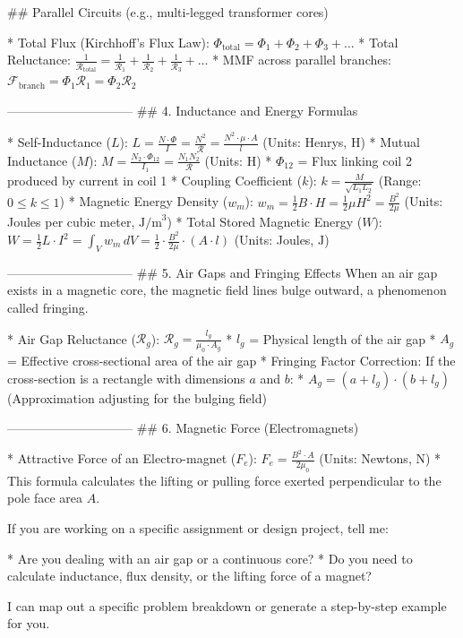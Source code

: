 ## Parallel Circuits (e.g., multi-legged transformer cores)

* Total Flux (Kirchhoff's Flux Law): $\Phi_{\text{total}} = \Phi_1 + \Phi_2 + \Phi_3 + \dots$
* Total Reluctance: $\frac{1}{\mathcal{R}_{\text{total}}} = \frac{1}{\mathcal{R}_1} + \frac{1}{\mathcal{R}_2} + \frac{1}{\mathcal{R}_3} + \dots$
* MMF across parallel branches: $\mathcal{F}_{\text{branch}} = \Phi_1 \mathcal{R}_1 = \Phi_2 \mathcal{R}_2$

------------------------------
## 4. Inductance and Energy Formulas

* Self-Inductance ($L$): $L = \frac{N \cdot \Phi}{I} = \frac{N^2}{\mathcal{R}} = \frac{N^2 \cdot \mu \cdot A}{l}$ (Units: Henrys, $\text{H}$)
* Mutual Inductance ($M$): $M = \frac{N_2 \cdot \Phi_{12}}{I_1} = \frac{N_1 N_2}{\mathcal{R}}$ (Units: $\text{H}$)
* $\Phi_{12}$ = Flux linking coil 2 produced by current in coil 1
* Coupling Coefficient ($k$): $k = \frac{M}{\sqrt{L_1 L_2}}$ (Range: $0 \le k \le 1$)
* Magnetic Energy Density ($w_m$): $w_m = \frac{1}{2} B \cdot H = \frac{1}{2} \mu H^2 = \frac{B^2}{2\mu}$ (Units: Joules per cubic meter, $\text{J/m}^3$)
* Total Stored Magnetic Energy ($W$): $W = \frac{1}{2} L \cdot I^2 = \int_V w_m \, dV = \frac{1}{2} \cdot \frac{B^2}{2\mu} \cdot (A \cdot l)$ (Units: Joules, $\text{J}$)

------------------------------
## 5. Air Gaps and Fringing Effects
When an air gap exists in a magnetic core, the magnetic field lines bulge outward, a phenomenon called fringing.

* Air Gap Reluctance ($\mathcal{R}_g$): $\mathcal{R}_g = \frac{l_g}{\mu_0 \cdot A_g}$
* $l_g$ = Physical length of the air gap
   * $A_g$ = Effective cross-sectional area of the air gap
* Fringing Factor Correction: If the cross-section is a rectangle with dimensions $a$ and $b$:
* $A_g = (a + l_g) \cdot (b + l_g)$ (Approximation adjusting for the bulging field)

------------------------------
## 6. Magnetic Force (Electromagnets)

* Attractive Force of an Electro-magnet ($F_e$): $F_e = \frac{B^2 \cdot A}{2\mu_0}$ (Units: Newtons, $\text{N}$)
* This formula calculates the lifting or pulling force exerted perpendicular to the pole face area $A$.

If you are working on a specific assignment or design project, tell me:

* Are you dealing with an air gap or a continuous core?
* Do you need to calculate inductance, flux density, or the lifting force of a magnet?

I can map out a specific problem breakdown or generate a step-by-step example for you.

